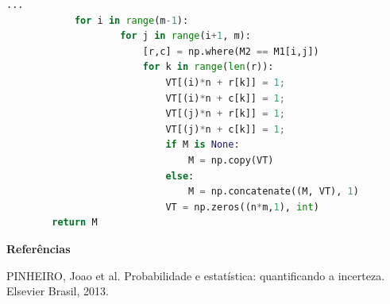 \documentclass[t]{beamer}
\begin{document}
\begin{frame}[fragile]

	\begin{lstlisting}[language=Python]
			... 
			for i in range(m-1):
					for j in range(i+1, m):
						[r,c] = np.where(M2 == M1[i,j])
						for k in range(len(r)):
							VT[(i)*n + r[k]] = 1;
							VT[(i)*n + c[k]] = 1;
							VT[(j)*n + r[k]] = 1;
							VT[(j)*n + c[k]] = 1;
							if M is None:
								M = np.copy(VT)
							else:
								M = np.concatenate((M, VT), 1)
							VT = np.zeros((n*m,1), int)
		return M
	\end{lstlisting}
\end{frame}

\begin{frame}[allowframebreaks]

\textbf{Referências}

\begin{itemize}
\begin{small}
\item PINHEIRO, Joao et al. Probabilidade e estatística: quantificando a incerteza. Elsevier Brasil, 2013.
\end{small}
\end{itemize}
\end{frame}
\end{document}
